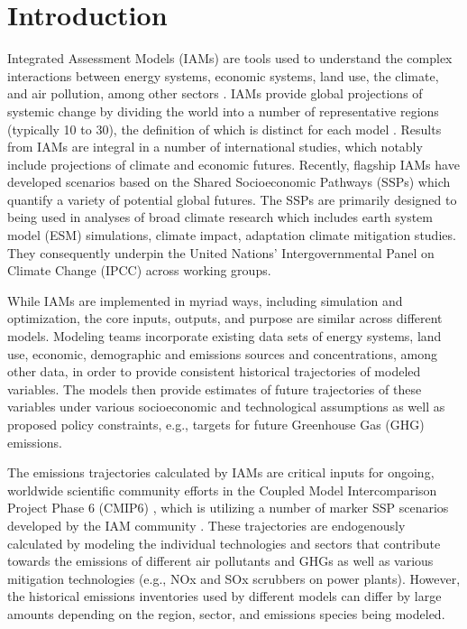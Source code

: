 \section{Introduction}

Integrated Assessment Models (IAMs) are tools used to understand the complex
interactions between energy systems, economic systems, land use, the climate,
and air pollution, among other sectors . IAMs provide global projections of
systemic change by dividing the world into a number of representative regions
(typically 10 to 30), the definition of which is distinct for each model
\cite{krey_global_2014}. Results from IAMs are integral in a number of
international studies, which notably include projections of climate and economic
futures. Recently, flagship IAMs have developed scenarios based on the Shared
Socioeconomic Pathways (SSPs) \cite{van_vuuren_energy_2017, fricko_marker_2017,
  fujimori_ssp3:_2017, calvin_ssp4:_2017, kriegler_fossil-fueled_2017} which
quantify a variety of potential global futures. The SSPs are primarily designed
to being used in analyses of broad climate research which includes earth system
model (ESM) simulations, climate impact, adaptation climate mitigation
studies. They consequently underpin the United Nations' Intergovernmental Panel
on Climate Change (IPCC) across working groups.

While IAMs are implemented in myriad ways, including simulation and
optimization, the core inputs, outputs, and purpose are similar across different
models. Modeling teams incorporate existing data sets of energy systems, land
use, economic, demographic and emissions sources and concentrations, among other
data, in order to provide consistent historical trajectories of modeled
variables. The models then provide estimates of future trajectories of these
variables under various socioeconomic and technological assumptions as well as
proposed policy constraints, e.g., targets for future Greenhouse Gas (GHG)
emissions.

The emissions trajectories calculated by IAMs are critical inputs for ongoing,
worldwide scientific community efforts in the Coupled Model Intercomparison
Project Phase 6 (CMIP6) \cite{eyring_overview_2016}, which is utilizing a number
of marker SSP scenarios developed by the IAM community
\cite{oneill_scenario_2016}. These trajectories are endogenously calculated by
modeling the individual technologies and sectors that contribute towards the
emissions of different air pollutants and GHGs as well as various mitigation
technologies (e.g., NOx and SOx scrubbers on power plants). However, the
historical emissions inventories used by different models can differ by large
amounts depending on the region, sector, and emissions species being modeled.

